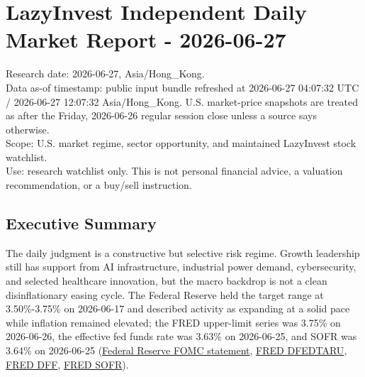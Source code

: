 \documentclass[
  9pt,
]{article}
\author{}
\date{}
\begin{document}
{
\hypersetup{linkcolor=}
\setcounter{tocdepth}{3}
\tableofcontents
}
\hypertarget{lazyinvest-independent-daily-market-report---2026-06-27}{%
\section{LazyInvest Independent Daily Market Report -
2026-06-27}\label{lazyinvest-independent-daily-market-report---2026-06-27}}

Research date: 2026-06-27, Asia/Hong\_Kong.\\
Data as-of timestamp: public input bundle refreshed at 2026-06-27
04:07:32 UTC / 2026-06-27 12:07:32 Asia/Hong\_Kong. U.S. market-price
snapshots are treated as after the Friday, 2026-06-26 regular session
close unless a source says otherwise.\\
Scope: U.S. market regime, sector opportunity, and maintained LazyInvest
stock watchlist.\\
Use: research watchlist only. This is not personal financial advice, a
valuation recommendation, or a buy/sell instruction.

\hypertarget{executive-summary}{%
\subsection{Executive Summary}\label{executive-summary}}

The daily judgment is a constructive but selective risk regime. Growth
leadership still has support from AI infrastructure, industrial power
demand, cybersecurity, and selected healthcare innovation, but the macro
backdrop is not a clean disinflationary easing cycle. The Federal
Reserve held the target range at 3.50\%-3.75\% on 2026-06-17 and
described activity as expanding at a solid pace while inflation remained
elevated; the FRED upper-limit series was 3.75\% on 2026-06-26, the
effective fed funds rate was 3.63\% on 2026-06-25, and SOFR was 3.64\%
on 2026-06-25
(\href{https://www.federalreserve.gov/newsevents/pressreleases/monetary20260617a.htm}{Federal
Reserve FOMC statement},
\href{https://fred.stlouisfed.org/series/DFEDTARU}{FRED DFEDTARU},
\href{https://fred.stlouisfed.org/series/DFF}{FRED DFF},
\href{https://fred.stlouisfed.org/series/SOFR}{FRED SOFR}).
\end{document}
